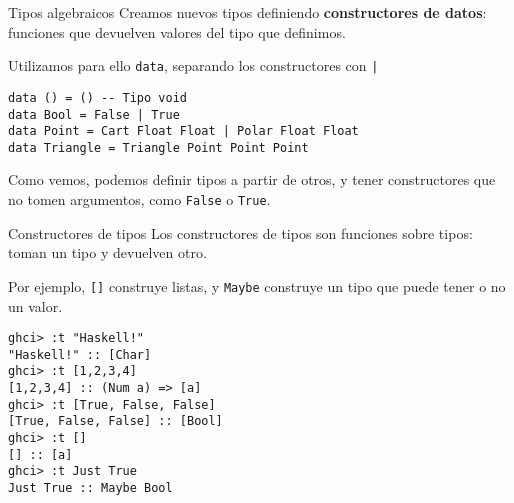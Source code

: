 \begin{frame}[fragile]{Tipos algebraicos}
  Creamos nuevos tipos definiendo \textbf{constructores de datos}: funciones que
  devuelven valores del tipo que definimos. %

  Utilizamos para ello \texttt{data}, separando los constructores con \texttt{|}

  \espacio

  \begin{lstlisting}
data () = () -- Tipo void
data Bool = False | True
data Point = Cart Float Float | Polar Float Float
data Triangle = Triangle Point Point Point
  \end{lstlisting}

  \espacio

  Como vemos, podemos definir tipos a partir de otros, y tener constructores que
  no tomen argumentos, como \texttt{False} o \texttt{True}.
\end{frame}

\begin{frame}[fragile]{Constructores de tipos}
  Los constructores de tipos son funciones sobre tipos: toman un tipo y devuelven otro.

  \espacio

  Por ejemplo, \texttt{[]} construye listas, y \texttt{Maybe} construye un tipo
  que puede tener o no un valor.

  \begin{lstlisting}
ghci> :t "Haskell!"
"Haskell!" :: [Char]
ghci> :t [1,2,3,4]
[1,2,3,4] :: (Num a) => [a]
ghci> :t [True, False, False]
[True, False, False] :: [Bool]
ghci> :t []
[] :: [a]
ghci> :t Just True
Just True :: Maybe Bool
  \end{lstlisting}
\end{frame}
